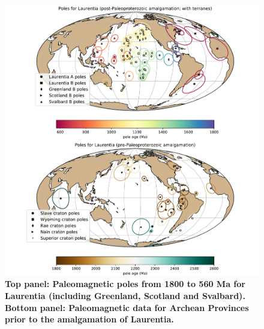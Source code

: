 \documentclass[11pt,letterpaper]{article}
\begin{document}
\begin{figure}
\centering
\includegraphics[width=\textwidth]{../Figures/Laurentia_poles_combined.pdf}
\caption{\small{\textbf{Top panel: Paleomagnetic poles from 1800 to 560 Ma for Laurentia (including Greenland, Scotland and Svalbard). Bottom panel: Paleomagnetic data for Archean Provinces prior to the amalgamation of Laurentia.}}}
\label{fig:Laurentia_poles}
\end{figure} 
\end{document}
